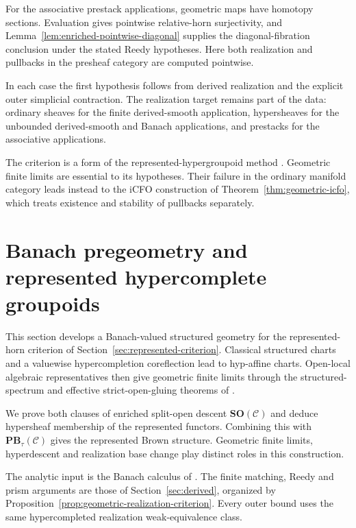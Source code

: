 \documentclass[12pt]{amsart}
\theoremstyle{definition}
\theoremstyle{remark}
\numberwithin{equation}{section}
\begin{document}
For the associative prestack applications, geometric maps
have homotopy sections. Evaluation gives pointwise
relative-horn surjectivity, and
Lemma~\ref{lem:enriched-pointwise-diagonal} supplies the
diagonal-fibration conclusion under the stated Reedy hypotheses.
Here both realization and pullbacks in the presheaf
category are computed pointwise.

In each case the first hypothesis follows from
derived realization and the explicit outer
simplicial contraction. The realization target remains
part of the data: ordinary sheaves for the finite
derived-smooth application, hypersheaves for the
unbounded derived-smooth and Banach applications,
and prestacks for the associative applications.

The criterion is a form of the represented-hypergroupoid
method \cite{Pridham2013}. Geometric finite limits are
essential to its hypotheses. Their failure in the
ordinary manifold category leads instead to the iCFO
construction of Theorem~\ref{thm:geometric-icfo}, which
treats existence and stability of pullbacks separately.

\section{Banach pregeometry and represented hypercomplete groupoids}
\label{sec:banach}

This section develops a Banach-valued structured geometry
for the represented-horn criterion of
Section~\ref{sec:represented-criterion}.
Classical structured charts and a valuewise hypercompletion
coreflection lead to hyp-affine charts. Open-local algebraic
representatives then give geometric finite limits through
the structured-spectrum and effective strict-open-gluing
theorems of \cite{LurieDAGV2009}.

We prove both clauses of enriched split-open descent
$\mathbf{SO}(\mathcal C)$ and deduce hypersheaf membership
of the represented functors. Combining this with
$\mathbf{PB}_\tau(\mathcal C)$ gives the represented
Brown structure. Geometric finite limits, hyperdescent
and realization base change play distinct roles in
this construction.

The analytic input is the Banach calculus of
\cite{Schmeding2021}. The finite matching, Reedy and prism
arguments are those of Section~\ref{sec:derived}, organized
by Proposition~\ref{prop:geometric-realization-criterion}.
Every outer bound uses the same hypercompleted realization
weak-equivalence class.
\end{document}
